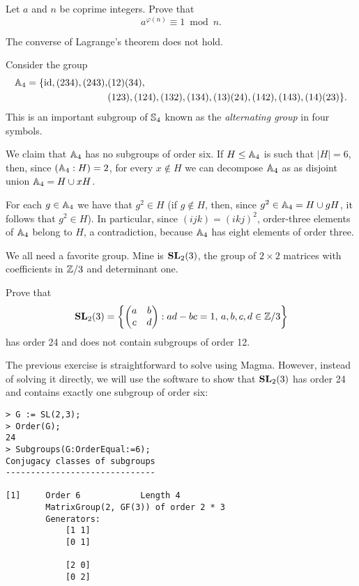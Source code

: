 \begin{exercise}
        Let $a$ and $n$ be coprime integers. Prove that 
        \[
        a^{\varphi(n)}\equiv1\bmod n.
        \]
\end{exercise}

The converse of Lagrange's theorem does not hold.   

\begin{example}
\label{exa:A4}
Consider the group 
    \begin{align*}
\mathbb{A}_4=\{\operatorname{id},(234),(243),&(12)(34),\\&(123),(124),(132),(134),(13)(24),(142),(143),(14)(23)\}.
\end{align*}
This is an important subgroup of $\mathbb{S}_4$ known as the 
\emph{alternating group} in four symbols. 

We claim that $\mathbb{A}_4$ has no subgroups of order six. If $H\leq\mathbb{A}_4$ is such that 
$|H|=6$, then, since $(\mathbb{A}_4:H)=2$, for every $x\not\in H$ we can decompose $\mathbb{A}_4$ as 
as disjoint union 
$\mathbb{A}_4=H\cup xH$.

For each $g\in\mathbb{A}_4$ we have that $g^2\in H$ (if $g\not\in H$, then, since $g^2\in\mathbb{A}_4=H\cup
gH$, it follows that $g^2\in H$). In particular, since 
$(ijk)=(ikj)^2$, order-three elements of $\mathbb{A}_4$ belong to $H$, a contradiction, 
because $\mathbb{A}_4$ has eight elements of order three. 
\end{example}

We all need a favorite group. Mine is $\mathbf{SL}_2(3)$,
the group of $2\times2$ matrices with coefficients in $\mathbb{Z}/3$
and determinant one. 

\begin{bonus}
Prove that    \[
    \mathbf{SL}_2(3)=\left\{\begin{pmatrix}a&b\\c&d\end{pmatrix}:ad-bc=1,\,a,b,c,d\in\mathbb{Z}/3\right\}
    \]
    has order 24 and does not contain subgroups of order 12.
\end{bonus}

The previous exercise is straightforward to solve using Magma. However, instead of solving it directly, we will use the software to show that $\mathbf{SL}_2(3)$ has order 24 and 
contains exactly one subgroup of order six:

\begin{lstlisting}
> G := SL(2,3);
> Order(G);
24
> Subgroups(G:OrderEqual:=6);
Conjugacy classes of subgroups
------------------------------

[1]     Order 6            Length 4
        MatrixGroup(2, GF(3)) of order 2 * 3
        Generators:
            [1 1]
            [0 1]

            [2 0]
            [0 2]
\end{lstlisting}

